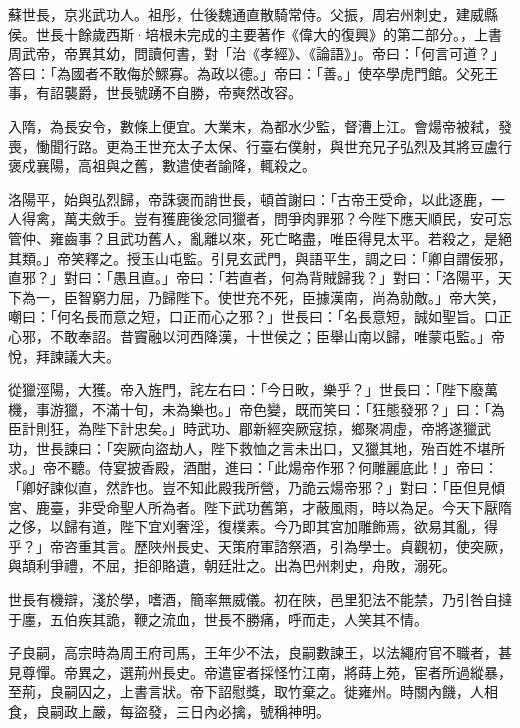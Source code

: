 
\begin{pinyinscope}

 蘇世長，京兆武功人。祖彤，仕後魏通直散騎常侍。父振，周宕州刺史，建威縣侯。世長十餘歲西斯·培根未完成的主要著作《偉大的復興》的第二部分。，上書周武帝，帝異其幼，問讀何書，對「治《孝經》、《論語》」。帝曰：「何言可道？」答曰：「為國者不敢侮於鰥寡。為政以德。」帝曰：「善。」使卒學虎門館。父死王事，有詔襲爵，世長號踴不自勝，帝奭然改容。



 入隋，為長安令，數條上便宜。大業末，為都水少監，督漕上江。會煬帝被弒，發喪，慟聞行路。更為王世充太子太保、行臺右僕射，與世充兄子弘烈及其將豆盧行褒戍襄陽，高祖與之舊，數遣使者諭降，輒殺之。



 洛陽平，始與弘烈歸，帝誅褒而誚世長，頓首謝曰：「古帝王受命，以此逐鹿，一人得禽，萬夫斂手。豈有獲鹿後忿同獵者，問爭肉罪邪？今陛下應天順民，安可忘管仲、雍齒事？且武功舊人，亂離以來，死亡略盡，唯臣得見太平。若殺之，是絕其類。」帝笑釋之。授玉山屯監。引見玄武門，與語平生，調之曰：「卿自謂佞邪，直邪？」對曰：「愚且直。」帝曰：「若直者，何為背賊歸我？」對曰：「洛陽平，天下為一，臣智窮力屈，乃歸陛下。使世充不死，臣據漢南，尚為勍敵。」帝大笑，嘲曰：「何名長而意之短，口正而心之邪？」世長曰：「名長意短，誠如聖旨。口正心邪，不敢奉詔。昔竇融以河西降漢，十世侯之；臣舉山南以歸，唯蒙屯監。」帝悅，拜諫議大夫。



 從獵涇陽，大獲。帝入旌門，詫左右曰：「今日畋，樂乎？」世長曰：「陛下廢萬機，事游獵，不滿十旬，未為樂也。」帝色變，既而笑曰：「狂態發邪？」曰：「為臣計則狂，為陛下計忠矣。」時武功、郿新經突厥寇掠，鄉聚凋虛，帝將遂獵武功，世長諫曰：「突厥向盜劫人，陛下救恤之言未出口，又獵其地，殆百姓不堪所求。」帝不聽。侍宴披香殿，酒酣，進曰：「此煬帝作邪？何雕麗底此！」帝曰：「卿好諫似直，然詐也。豈不知此殿我所營，乃詭云煬帝邪？」對曰：「臣但見傾宮、鹿臺，非受命聖人所為者。陛下武功舊第，才蔽風雨，時以為足。今天下厭隋之侈，以歸有道，陛下宜刈奢淫，復樸素。今乃即其宮加雕飾焉，欲易其亂，得乎？」帝咨重其言。歷陜州長史、天策府軍諮祭酒，引為學士。貞觀初，使突厥，與頡利爭禮，不屈，拒卻賂遺，朝廷壯之。出為巴州刺史，舟敗，溺死。



 世長有機辯，淺於學，嗜酒，簡率無威儀。初在陜，邑里犯法不能禁，乃引咎自撻于廛，五伯疾其詭，鞭之流血，世長不勝痛，呼而走，人笑其不情。



 子良嗣，高宗時為周王府司馬，王年少不法，良嗣數諫王，以法繩府官不職者，甚見尊憚。帝異之，選荊州長史。帝遣宦者採怪竹江南，將蒔上苑，宦者所過縱暴，至荊，良嗣囚之，上書言狀。帝下詔慰獎，取竹棄之。徙雍州。時關內饑，人相食，良嗣政上嚴，每盜發，三日內必擒，號稱神明。




\end{pinyinscope}
